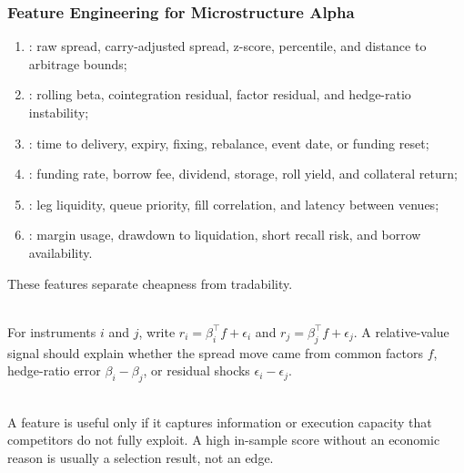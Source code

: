\subsubsection{Feature Engineering for Microstructure Alpha}

\begin{taxonomy} 
\begin{enumerate}[label=\roman*.]
\setlength{\itemsep}{0pt}
\item {}: raw spread, carry-adjusted spread, z-score, percentile, and distance to arbitrage bounds;
\item {}: rolling beta, cointegration residual, factor residual, and hedge-ratio instability;
\item {}: time to delivery, expiry, fixing, rebalance, event date, or funding reset;
\item {}: funding rate, borrow fee, dividend, storage, roll yield, and collateral return;
\item {}: leg liquidity, queue priority, fill correlation, and latency between venues;
\item {}: margin usage, drawdown to liquidation, short recall risk, and borrow availability.
\end{enumerate}
These features separate cheapness from tradability.
\end{taxonomy}

\begin{model} \\
For instruments $i$ and $j$, write $r_i=\beta_i^\top f+\epsilon_i$ and $r_j=\beta_j^\top f+\epsilon_j$. A relative-value signal should explain whether the spread move came from common factors $f$, hedge-ratio error $\beta_i-\beta_j$, or residual shocks $\epsilon_i-\epsilon_j$.
\end{model}

\begin{principle} \\
A feature is useful only if it captures information or execution capacity that competitors do not fully exploit. A high in-sample score without an economic reason is usually a selection result, not an edge.
\end{principle}

